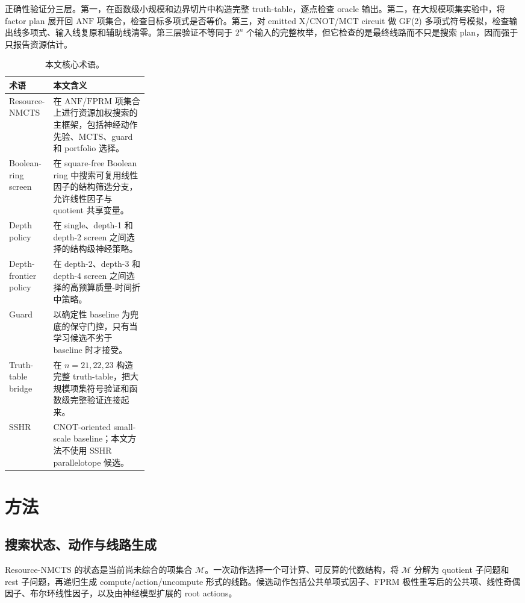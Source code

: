 \documentclass[UTF8,fontset=macnew,11pt]{ctexart}
\newcommand{\method}{Resource-NMCTS}
\newcommand{\screen}{Boolean-ring screen}
\newcommand{\anf}{\ensuremath{\mathrm{ANF}}}
\newcommand{\fprm}{\ensuremath{\mathrm{FPRM}}}
\newcommand{\mcts}{\ensuremath{\mathrm{MCTS}}}
\newcommand{\ttable}{truth-table}
\newcommand{\mct}{\ensuremath{\mathrm{MCT}}}
\begin{document}
正确性验证分三层。第一，在函数级小规模和边界切片中构造完整 \ttable{}，逐点检查 oracle 输出。第二，在大规模项集实验中，将 factor plan 展开回 \anf{} 项集合，检查目标多项式是否等价。第三，对 emitted X/CNOT/\mct{} circuit 做 GF(2) 多项式符号模拟，检查输出线多项式、输入线复原和辅助线清零。第三层验证不等同于 $2^n$ 个输入的完整枚举，但它检查的是最终线路而不只是搜索 plan，因而强于只报告资源估计。

\begin{table}[H]
\centering
\small
\caption{本文核心术语。}
\label{tab:terms}
\begin{tabularx}{\linewidth}{>{\raggedright\arraybackslash}p{0.27\linewidth}>{\raggedright\arraybackslash}X}
\toprule
术语 & 本文含义 \\
\midrule
\method{} & 在 \anf{}/\fprm{} 项集合上进行资源加权搜索的主框架，包括神经动作先验、\mcts{}、guard 和 portfolio 选择。 \\
\screen{} & 在 square-free Boolean ring 中搜索可复用线性因子的结构筛选分支，允许线性因子与 quotient 共享变量。 \\
Depth policy & 在 single、depth-1 和 depth-2 screen 之间选择的结构级神经策略。 \\
Depth-frontier policy & 在 depth-2、depth-3 和 depth-4 screen 之间选择的高预算质量-时间折中策略。 \\
Guard & 以确定性 baseline 为兜底的保守门控，只有当学习候选不劣于 baseline 时才接受。 \\
Truth-table bridge & 在 $n=21,22,23$ 构造完整 \ttable{}，把大规模项集符号验证和函数级完整验证连接起来。 \\
SSHR & CNOT-oriented small-scale baseline；本文方法不使用 SSHR parallelotope 候选。 \\
\bottomrule
\end{tabularx}
\end{table}

\section{方法}

\subsection{搜索状态、动作与线路生成}

\method{} 的状态是当前尚未综合的项集合 $\mathcal{M}$。一次动作选择一个可计算、可反算的代数结构，将 $\mathcal{M}$ 分解为 quotient 子问题和 rest 子问题，再递归生成 compute/action/uncompute 形式的线路。候选动作包括公共单项式因子、\fprm{} 极性重写后的公共项、线性奇偶因子、布尔环线性因子，以及由神经模型扩展的 root actions。
\end{document}
